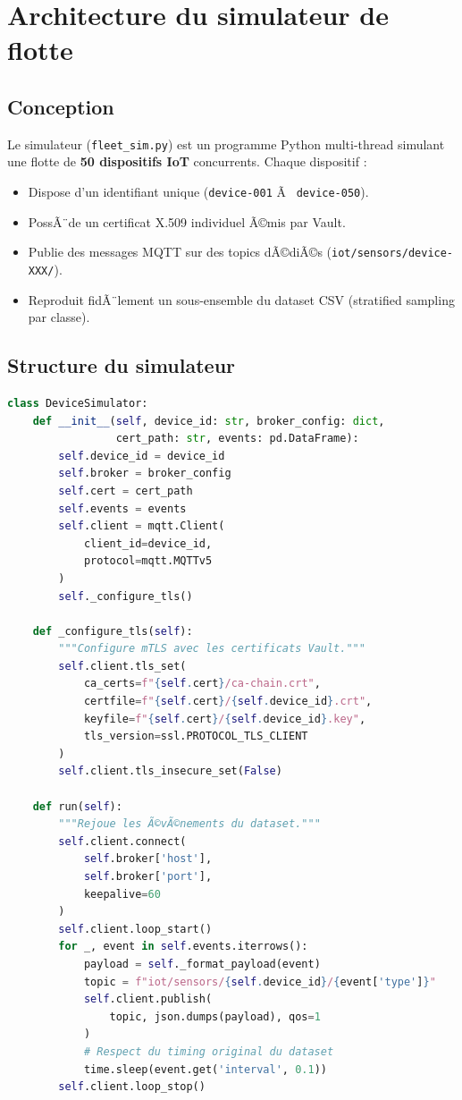 \section{Architecture du simulateur de flotte}

\subsection{Conception}

Le simulateur (\texttt{fleet\_sim.py}) est un programme Python multi-thread simulant une flotte de \textbf{50 dispositifs IoT} concurrents. Chaque dispositif :
\begin{itemize}
  \item Dispose d'un identifiant unique (\texttt{device-001} Ã  \texttt{device-050}).
  \item PossÃ¨de un certificat X.509 individuel Ã©mis par Vault.
  \item Publie des messages MQTT sur des topics dÃ©diÃ©s (\texttt{iot/sensors/device-XXX/}).
  \item Reproduit fidÃ¨lement un sous-ensemble du dataset CSV (stratified sampling par classe).
\end{itemize}

\subsection{Structure du simulateur}

\begin{lstlisting}[language=python, caption=Extrait de fleet\_sim.py â€” classe DeviceSimulator]
class DeviceSimulator:
    def __init__(self, device_id: str, broker_config: dict,
                 cert_path: str, events: pd.DataFrame):
        self.device_id = device_id
        self.broker = broker_config
        self.cert = cert_path
        self.events = events
        self.client = mqtt.Client(
            client_id=device_id,
            protocol=mqtt.MQTTv5
        )
        self._configure_tls()

    def _configure_tls(self):
        """Configure mTLS avec les certificats Vault."""
        self.client.tls_set(
            ca_certs=f"{self.cert}/ca-chain.crt",
            certfile=f"{self.cert}/{self.device_id}.crt",
            keyfile=f"{self.cert}/{self.device_id}.key",
            tls_version=ssl.PROTOCOL_TLS_CLIENT
        )
        self.client.tls_insecure_set(False)

    def run(self):
        """Rejoue les Ã©vÃ©nements du dataset."""
        self.client.connect(
            self.broker['host'],
            self.broker['port'],
            keepalive=60
        )
        self.client.loop_start()
        for _, event in self.events.iterrows():
            payload = self._format_payload(event)
            topic = f"iot/sensors/{self.device_id}/{event['type']}"
            self.client.publish(
                topic, json.dumps(payload), qos=1
            )
            # Respect du timing original du dataset
            time.sleep(event.get('interval', 0.1))
        self.client.loop_stop()
\end{lstlisting}

